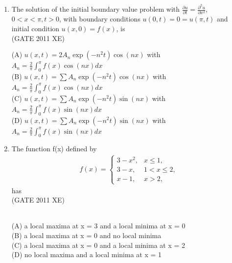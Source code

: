 \documentclass[journal,12pt,onecolumn]{IEEEtran}
\begin{document}
\begin{enumerate}[label=\textbf{Q\arabic*.},itemsep=2em]
\hfill{(GATE 2011 XE)} \\
\begin{multicols}{4}
(A) $e_{n+1} = \frac{2}{n} e_n^2$ \\
(B) $e_{n+1} = \frac{1}{2} e_n$ \\
(C) $e_{n+1} = \frac{\sqrt{5}}{2} e_n$ \\
(D) $e_{n+1} = e_n$
\end{multicols}

\item The solution of the initial boundary value problem with $\frac{\partial u}{\partial t} = \frac{\partial^2 u}{\partial x^2}$, $0 < x < \pi, t > 0$, with boundary conditions $u(0,t)=0 = u(\pi, t)$ and initial condition $u(x,0) = f(x)$, is \\

\hfill{(GATE 2011 XE)} \\
\begin{multicols}{2}
(A) $u(x,t) = 2 A_n \exp(-n^2 t) \cos(nx)$ with $A_n = \frac{2}{\pi} \int_0^{\pi} f(x) \cos(nx) dx$ \\
(B) $u(x,t) = \sum A_n \exp(-n^2 t) \cos(nx)$ with $A_n = \frac{2}{\pi} \int_0^{\pi} f(x) \cos(nx) dx$ \\
(C) $u(x,t) = \sum A_n \exp(-n^2 t) \sin(nx)$ with $A_n = \frac{2}{\pi} \int_0^{\pi} f(x) \sin(nx) dx$ \\
(D) $u(x,t) = \sum A_n \exp(-n^2 t) \sin(nx)$ with $A_n = \frac{2}{\pi} \int_0^{\pi} f(x) \sin(nx) dx$
\end{multicols}

\item The function f(x) defined by
\begin{align} 
f(x) = 
\begin{cases} 
3 - x^2, & x \leq 1, \\
3 - x, & 1 < x \leq 2, \\
x - 1, & x > 2,
\end{cases}
\end{align}
has\\ 

\hfill{(GATE 2011 XE)} \\\
\begin{multicols}{2}
(A) a local maxima at x = 3 and a local minima at x = 0 \\
(B) a local maxima at x = 0 and no local minima \\ 
(C) a local maxima at x = 0 and a local minima at x = 2 \\
(D) no local maxima and a local minima at x = 1
\end{multicols}



\end{enumerate}
\end{document}
